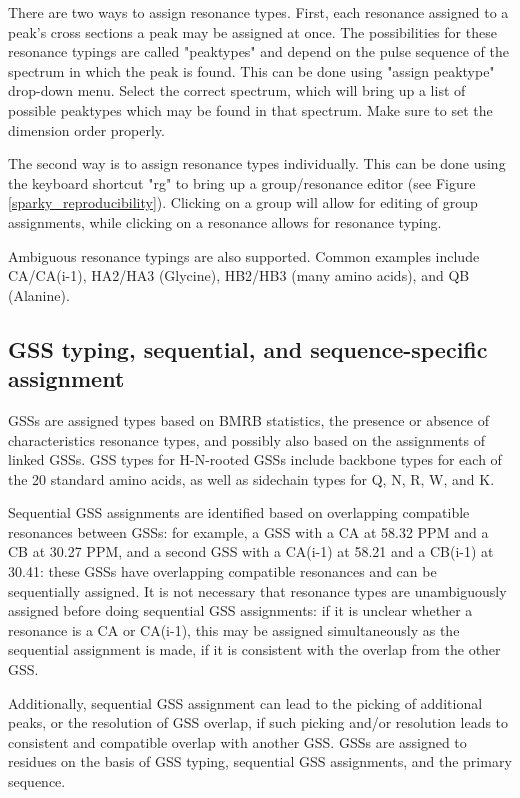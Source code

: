 There are two ways to assign resonance types.  First, each resonance assigned
to a peak's cross sections a peak may be assigned at once.  The possibilities
for these resonance typings are called "peaktypes" and depend on the pulse 
sequence of the spectrum in which the peak is found.
This can be done using "assign peaktype" drop-down menu.  Select the correct
spectrum, which will bring up a list of possible peaktypes which may be found
in that spectrum.  Make sure to set the dimension order properly.

The second way is to assign resonance types individually.  This can be done 
using the keyboard shortcut "rg" to bring up a group/resonance editor
(see Figure \ref{sparky_reproducibility}).  Clicking on a group will allow
for editing of group assignments, while clicking on a resonance allows for
resonance typing.

Ambiguous resonance typings are also supported.  Common examples include
CA/CA(i-1), HA2/HA3 (Glycine), HB2/HB3 (many amino acids), and QB (Alanine).

\subsection{GSS typing, sequential, and sequence-specific assignment}
GSSs are assigned types based on BMRB statistics, the presence or absence of
characteristics resonance types, and possibly also based on the assignments 
of linked GSSs.
GSS types for H-N-rooted GSSs include backbone types for each of the 20 
standard amino acids, as well as sidechain types for Q, N, R, W, and K.

Sequential GSS assignments are identified based on overlapping compatible
resonances between GSSs: for example, a GSS with a CA at 58.32 PPM and a CB
at 30.27 PPM, and a second GSS with a CA(i-1) at 58.21 and a CB(i-1) at 30.41:
these GSSs have overlapping compatible resonances and can be sequentially
assigned.
It is not necessary that resonance types are unambiguously assigned before
doing sequential GSS assignments: if it is unclear whether a resonance is a
CA or CA(i-1), this may be assigned simultaneously as the sequential assignment
is made, if it is consistent with the overlap from the other GSS.

Additionally, sequential GSS assignment can lead to the picking of additional
peaks, or the resolution of GSS overlap, if such picking and/or resolution
leads to consistent and compatible overlap with another GSS.
GSSs are assigned to residues on the basis of GSS typing, sequential GSS
assignments, and the primary sequence.

